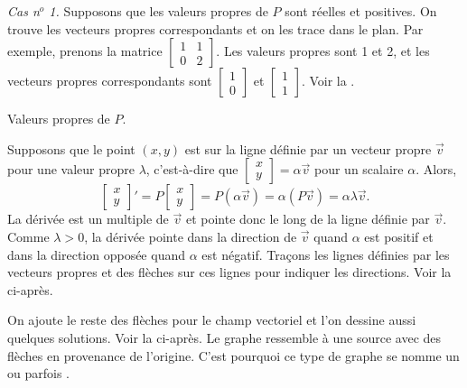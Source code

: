 \emph{Cas n$^o$ 1.} Supposons que les valeurs propres de $P$ sont réelles et positives. On trouve les vecteurs propres correspondants et on les trace dans le plan. Par exemple, prenons la matrice $\left[ \begin{smallmatrix} 1 & 1 \\ 0 & 2 \end{smallmatrix}
\right]$.
Les valeurs propres sont 1 et 2, et les vecteurs propres correspondants sont
$\left[ \begin{smallmatrix} 1 \\ 0 \end{smallmatrix} \right]$ et
$\left[ \begin{smallmatrix} 1 \\ 1 \end{smallmatrix} \right]$. Voir la
.

\begin{mywrapfig}{3.25in}
\capstart
{}
\caption{Valeurs propres de $P$.\label{pln:source-eigfig}}
\end{mywrapfig}

Supposons que le point $(x,y)$ est sur la ligne définie par un vecteur propre
$\vec{v}$ pour une valeur propre $\lambda$,
c'est-à-dire que
$\left[ \begin{smallmatrix} x \\ y \end{smallmatrix} \right] = \alpha \vec{v}$
pour un scalaire $\alpha$.
Alors, 
\begin{equation*}
\begin{bmatrix} x \\ y \end{bmatrix} '
=
P \begin{bmatrix} x \\ y \end{bmatrix}
=
P ( \alpha \vec{v} ) = \alpha ( P \vec{v} )
= \alpha \lambda \vec{v} .
\end{equation*}
La dérivée est un multiple de $\vec{v}$ et pointe donc le long de la ligne définie par $\vec{v}$. Comme $\lambda > 0$, la dérivée pointe dans la direction de $\vec{v}$ quand $\alpha$ est positif et dans la direction opposée quand $\alpha$ est négatif. Traçons les lignes définies par les vecteurs propres et des flèches sur ces lignes pour indiquer les directions.
Voir la  ci-après.

On ajoute le reste des flèches pour le champ vectoriel et l'on dessine aussi quelques solutions. Voir la
 ci-après.
Le graphe ressemble à une source avec des flèches en provenance de l'origine. C'est pourquoi ce type de graphe se nomme un \emph{} ou parfois \emph{}.

